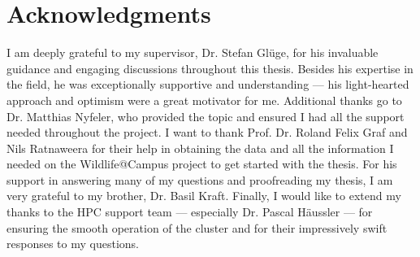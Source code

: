 

\vspace*{\fill}

\section*{Acknowledgments}
\label{acknowledgments}

I am deeply grateful to my supervisor, Dr. Stefan Glüge, for his invaluable guidance and engaging discussions throughout this thesis.
Besides his expertise in the field, he was exceptionally supportive and understanding --- his light-hearted approach and optimism were a great motivator for me.
Additional thanks go to Dr. Matthias Nyfeler, who provided the topic and ensured I had all the support needed throughout the project.  
I want to thank Prof. Dr. Roland Felix Graf and Nils Ratnaweera for their help in obtaining the data and all the information I needed on the Wildlife@Campus project to get started with the thesis.
For his support in answering many of my questions and proofreading my thesis, I am very grateful to my brother, Dr. Basil Kraft.
Finally, I would like to extend my thanks to the HPC support team --- especially Dr. Pascal Häussler --- for ensuring the smooth operation of the cluster and for their impressively swift responses to my questions.
\vspace*{\fill}

